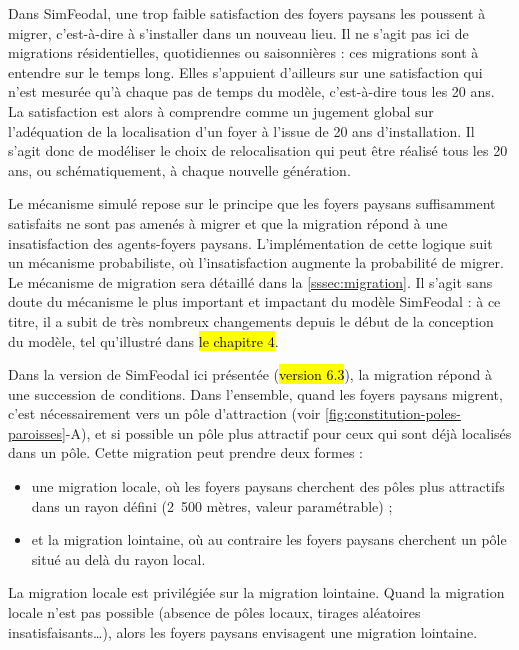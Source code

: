 \begin{tcolorbox}[breakable,left=0pt,right=0pt,top=0pt,bottom=0pt,
	colback=gray!15,colframe=gray!15,width=\dimexpr\textwidth\relax, 
	enlarge left by=0mm, boxsep=5pt,arc=0pt,outer arc=0pt]
Dans SimFeodal, une trop faible satisfaction des foyers paysans les poussent à migrer, c'est-à-dire à s'installer dans un nouveau lieu.
Il ne s'agit pas ici de migrations résidentielles, quotidiennes ou saisonnières : ces migrations sont à entendre sur le temps long.
Elles s'appuient d'ailleurs sur une satisfaction qui n'est mesurée qu'à chaque pas de temps du modèle, c'est-à-dire tous les 20 ans.
La satisfaction est alors à comprendre comme un jugement global sur l'adéquation de la localisation d'un foyer à l'issue de 20 ans d'installation.
Il s'agit donc de modéliser le choix de relocalisation qui peut être réalisé tous les 20 ans, ou schématiquement, à chaque nouvelle génération.

\medskip
Le mécanisme simulé repose sur le principe que les foyers paysans suffisamment satisfaits ne sont pas amenés à migrer et que la migration répond à une insatisfaction des agents-foyers paysans.
L'implémentation de cette logique suit un mécanisme probabiliste, où l'insatisfaction augmente la probabilité de migrer.
Le mécanisme de migration sera détaillé dans la \cref{sssec:migration}.
Il s'agit sans doute du mécanisme le plus important et impactant du modèle SimFeodal : à ce titre, il a subit de très nombreux changements depuis le début de la conception du modèle, tel qu'illustré dans \hl{le chapitre 4}.

\medskip
Dans la version de SimFeodal ici présentée (\hl{version 6.3}), la migration répond à une succession de conditions.
Dans l'ensemble, quand les foyers paysans migrent, c'est nécessairement vers un pôle d'attraction (voir \cref{fig:constitution-poles-paroisses}-A), et si possible un pôle plus attractif pour ceux qui sont déjà localisés dans un pôle.
Cette migration peut prendre deux formes :
\begin{itemize}
	\item une migration \og locale\fg{}, où les foyers paysans cherchent des pôles plus attractifs dans un rayon défini (2~500 mètres, valeur paramétrable) ;
	\item et la migration \og lointaine\fg{}, où au contraire les foyers paysans cherchent un pôle situé au delà du rayon local.
\end{itemize} 

La migration locale est privilégiée sur la migration lointaine\footnotemark.
Quand la migration locale n'est pas possible (absence de pôles locaux, tirages aléatoires insatisfaisants\ldots), alors les foyers paysans envisagent une migration lointaine.
\end{tcolorbox}

